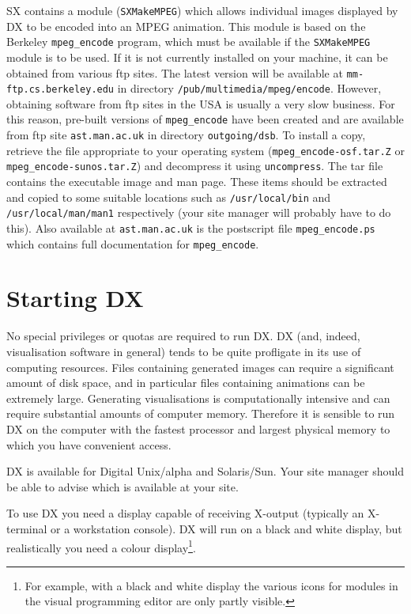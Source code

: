 SX contains a module ({\tt{SXMakeMPEG}}) which allows individual images
displayed by DX to be encoded into an MPEG animation.  This module is
based on the Berkeley {\tt{mpeg\_encode}} program, which must be available
if the {\tt{SXMakeMPEG}} module is to be used.  If it is not currently
installed on your machine, it can be obtained from various ftp sites.  The
latest version  will be available at {\tt mm-ftp.cs.berkeley.edu} in
directory {\tt{/pub/multimedia/mpeg/encode}}.  However, obtaining software
from ftp sites in the USA is usually a very slow business.  For this
reason, pre-built versions of {\tt{mpeg\_encode}} have been created and
are available from ftp site {\tt{ast.man.ac.uk}} in directory
{\tt{outgoing/dsb}}. To install a copy, retrieve the file appropriate to
your operating system ({\tt{mpeg\_encode-osf.tar.Z}} or
{\tt{mpeg\_encode-sunos.tar.Z}}) and decompress it using
{\tt{uncompress}}.  The tar file contains the executable image and man
page.  These items should be extracted and copied to some suitable
locations such as {\tt{/usr/local/bin}} and {\tt{/usr/local/man/man1}}
respectively (your site manager will probably have to do this).  Also
available at {\tt{ast.man.ac.uk}} is the postscript file
{\tt{mpeg\_encode.ps}} which contains full documentation for
{\tt{mpeg\_encode}}.


\section{Starting DX  }

No special privileges or quotas are required to run DX. DX (and, indeed,
visualisation software in general) tends to be quite profligate in its
use of computing resources. Files containing generated images can
require a significant amount of disk space, and in particular files
containing animations can be extremely large. Generating visualisations is
computationally intensive and can require substantial amounts of computer
memory. Therefore it is sensible to run DX on the computer with the
fastest processor and largest physical memory to which you have convenient
access.

DX is available for Digital Unix/alpha and Solaris/Sun.  Your site manager
should be able to advise which is available at your site.

To use DX you need a display capable of receiving X-output (typically an
X-terminal or a workstation console). DX will run on a black and white
display, but realistically you need a colour display\footnote{ For
example, with a black and white display the various icons for modules
in the visual programming editor are only partly visible.}.

